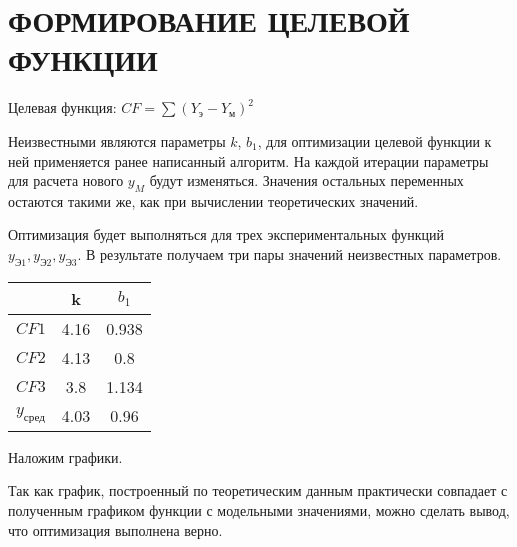 \part{ФОРМИРОВАНИЕ ЦЕЛЕВОЙ ФУНКЦИИ}
    \begin{center}
        Целевая функция: $CF=\sum(Y_{\text{э}} - Y_{\text{м}})^2$
    \end{center}

    Неизвестными являются параметры $k$, $b_1$, для оптимизации целевой функции к ней применяется ранее написанный алгоритм. На каждой итерации параметры для расчета нового $y_M$ будут изменяться. Значения остальных переменных остаются такими же, как при вычислении теоретических значений.

    Оптимизация будет выполняться для трех экспериментальных функций $y_{\text{Э1}}, y_{\text{Э2}}, y_{\text{Э3}}$. В результате получаем три пары значений неизвестных параметров.

    \begin{center}
        \begin{tabular}{c|c|c|}
        \cline{2-3}
                                    & k    & $b_1$ \\ \hline
        \multicolumn{1}{|c|}{$CF1$} & 4.16 & 0.938 \\ \hline
        \multicolumn{1}{|c|}{$CF2$} & 4.13 & 0.8   \\ \hline
        \multicolumn{1}{|c|}{$CF3$} & 3.8  & 1.134 \\ \hline
        \multicolumn{1}{|c|}{$y_{\text{сред}}$}   & 4.03  & 0.96   \\ \hline
        \end{tabular}
    \end{center}

    Наложим графики.

    \begin{center}
    \end{center}

    Так как график, построенный по теоретическим данным практически совпадает с полученным графиком функции с модельными значениями, можно сделать вывод, что оптимизация выполнена верно.
